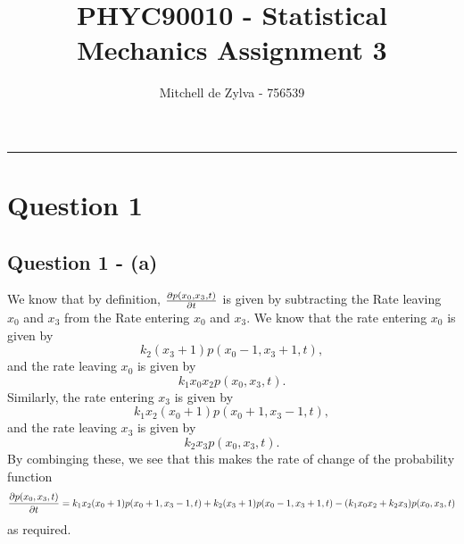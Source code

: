 \documentclass[11pt,a4paper]{article}
\begin{document}
\title{\bf PHYC90010 - Statistical Mechanics Assignment 3}
\author{Mitchell de Zylva - 756539}
\maketitle



\begin{center}
\vspace{1cm}
\rule{145mm}{0.5mm}
\vspace{1cm}
\end{center}
\tableofcontents
\newpage
%
\newpage




\section{Question 1}
\label{sec:question1}
\subsection{Question 1 - (a)}
\label{sec:question1:subsec:parta}
We know that by definition, $\pdv{p(x_0,x_3,t)}{t}$ is given by subtracting the Rate leaving $x_0$ and $x_3$ from the Rate entering $x_0$ and $x_3$. We know that the rate entering $x_0$ is given by 
$$ k_2 (x_3 + 1) p(x_0-1,x_3+1,t),  $$
and the rate leaving $x_0$ is given by 
$$ k_1 x_0 x_2 p(x_0,x_3,t).  $$
Similarly, the rate entering $x_3$ is given by 
$$ k_1 x_2 (x_0+1) p(x_0+1,x_3-1,t), $$
and the rate leaving $x_3$ is given by 
$$ k_2 x_3 p(x_0,x_3,t) .$$
By combinging these, we see that this makes the rate of change of the probability function 
\begin{equation}\label{eq:master_eq}
\pdv{p(x_0,x_3,t)}{t} = k_1 x_2 (x_0+1) p(x_0+1,x_3-1,t) + k_2 (x_3+1) p(x_0-1,x_3+1,t) - (k_1 x_0 x_2 + k_2 x_3) p(x_0,x_3,t)
\end{equation}
as required.
\end{document}
